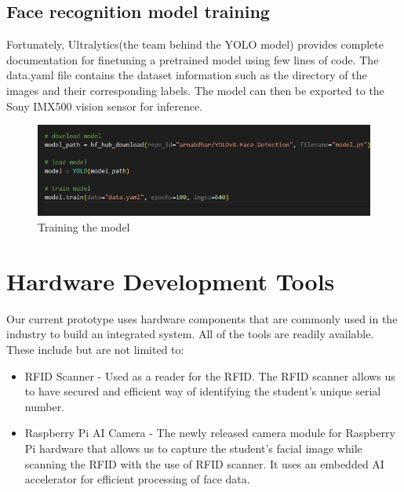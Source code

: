 \subsection{Face recognition model training} 
Fortunately, Ultralytics(the team behind the YOLO model) provides complete documentation for finetuning a pretrained model using few lines of code. The data.yaml file contains the dataset information such as the directory of the images and their corresponding labels. The model can then be exported to the Sony IMX500 vision sensor for inference\cite{ultralytics_yolo_docs_2024}. 
\begin{figure}[h] %
	\centering
	\includegraphics[width=1\textwidth]{figures/chapter3/train.png} %
	\caption{Training the model}
	\label{fig:api}
\end{figure} 


\section{Hardware Development Tools}
Our current prototype uses hardware components that are commonly used in the industry to build an integrated system. All of the tools are readily available. These include but are not limited to:

\begin{itemize}
	\item	RFID Scanner - Used as a reader for the RFID. The RFID scanner allows us to have secured and efficient way of identifying the student's unique serial number.

\end{itemize}

\begin{itemize}
	\item	Raspberry Pi AI Camera - The newly released camera module for Raspberry Pi hardware that allows us to capture the student's facial image while scanning the RFID with the use of RFID scanner. It uses an embedded AI accelerator for efficient processing of face data.
	
\end{itemize} 

